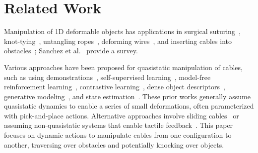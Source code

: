 \section{Related Work}

Manipulation of 1D deformable objects has applications in surgical suturing~\cite{schulman_case_study_2013,suturing_autolab_2016}, knot-tying~\cite{van_den_berg_2010,case_study_knots_1991,knot_planning_2003,tying_precisely_2016}, untangling ropes~\cite{rope_untangling_2013,grannen2020untangling,tactile_cable_2020}, deforming wires~\cite{wire_insertion_1996,wire_insertion_1997}, and inserting cables into obstacles~\cite{tight_tolerance_insertion_2015}; Sanchez et al.~\cite{survey_2018} provide a survey.

Various approaches have been proposed for quasistatic manipulation of cables, such as using demonstrations~\cite{schulman_isrr_2013,lee_LFD_IROS_2014,seita_bags_2021}, self-supervised learning~\cite{nair_rope_2017,ZSVI_2018, jin2024multi}, model-free reinforcement learning~\cite{lerrel_2020,corl2020softgym, elmquist2022art}, contrastive learning~\cite{yan2020learning, sim2019personalization}, dense object descriptors~\cite{priya_2020, eisner2022flowbot3d, pan2023tax}, generative modeling~\cite{wang_visual_planning_2019, avigal20206, avigal2021avplug}, and state estimation~\cite{state_estimation_LDO, zhang2020dex, zhang2021robots, zhang2023flowbot++, yao2023apla}. These prior works generally assume quasistatic dynamics to enable a series of small deformations, often parameterized with pick-and-place actions. Alternative approaches involve sliding cables~\cite{one_hand_knotting_tactile_2007,zhu_sliding_cables_2019} or assuming non-quasistatic systems that enable tactile feedback~\cite{tactile_cable_2020, jin2024multi}. This paper focuses on dynamic actions to manipulate cables from one configuration to another, traversing over obstacles and potentially knocking over objects.

